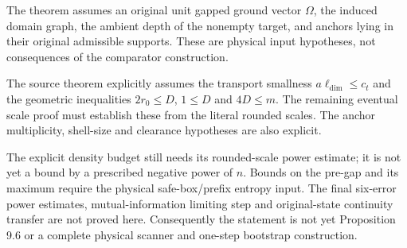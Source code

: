 \documentclass{article}
\begin{document}
The theorem assumes an original unit gapped ground vector $\Omega$, the
induced domain graph, the ambient depth of the nonempty target, and anchors
lying in their original admissible supports. These are physical input
hypotheses, not consequences of the comparator construction.

The source theorem explicitly assumes the transport smallness
$a\ell_{\dim}\le c_t$ and the geometric inequalities
$2r_0\le D$, $1\le D$ and $4D\le m$. The remaining eventual scale proof
must establish these from the literal rounded scales. The anchor
multiplicity, shell-size and clearance hypotheses are also explicit.

The explicit density budget still needs its rounded-scale power estimate;
it is not yet a bound by a prescribed negative power of $n$. Bounds on the
pre-gap and its maximum require the physical safe-box/prefix entropy input.
The final six-error power estimates, mutual-information limiting step and
original-state continuity transfer are not proved here. Consequently the
statement is not yet Proposition 9.6 or a complete physical scanner and
one-step bootstrap construction.



\end{document}
